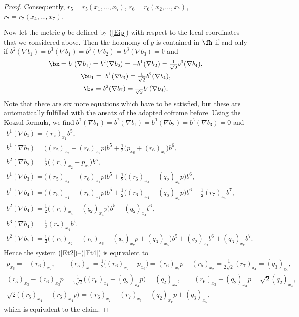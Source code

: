 \begin{proof}
Consequently, $r_5=r_5(x_1,\dots,x_7)$, $r_6=r_6(x_2,\dots,x_7)$, $r_7=r_7(x_4,\dots,x_7)$.

Now let the metric $g$ be defined by (\ref{Eip}) with respect to the local coordinates that we considered above. Then the holonomy of $g$ is contained in $\fh$ if and only if $b^2(\nabla b_{1})=b^3(\nabla b_{1})=b^3(\nabla b_{2})=b^3(\nabla b_{3})=0$ and
\begin{gather}
\bx=b^1(\nabla b_1)=b^2(\nabla b_2)=-b^1(\nabla b_2)= \tfrac1{\sqrt2} b^3(\nabla b_4), \label{Et2}\\
\bu_1=\ b^1(\nabla b_3)= \tfrac 1{\sqrt2}b^2(\nabla b_4), \\
\bv= b^2(\nabla b_7)= \tfrac 1{\sqrt2}b^1(\nabla b_4). \label{Et4}
\end{gather}
Note that there are six more equations which have to be satisfied, but these are automatically fulfilled with the ansatz of the adapted coframe before. Using the Koszul formula, we find $b^2(\nabla b_{1})=b^3(\nabla b_{1})=b^3(\nabla b_{2})=b^3(\nabla b_{3})=0$ and
\begin{gather*}
b^1(\nabla b_1) = (r_5)_{x_1} b^5, \\
b^1(\nabla b_2) = \big((r_5)_{x_2} -(r_6)_{x_2}p\big)b^5 + \tfrac12 \big(p_{x_6}+(r_6)_{x_2}\big) b^6, \\
b^{2}(\nabla b_{2})= \tfrac12\big((r_6)_{x_2}- p_{x_6}\big) b^5, \\
b^1(\nabla b_3)= \big((r_5)_{x_3} -(r_6)_{x_3}p\big)b^5 +\tfrac12\big((r_6)_{x_3}- (q_2)_{x_3}p\big) b^6 , \\
b^1(\nabla b_4) = \big( (r_5)_{x_4}-(r_6)_{x_4} p\big)b^5 +\tfrac12\big((r_6)_{x_4}-(q_2)_{x_4} p\big) b^6 +\frac12 (r_7)_{x_4}b^7 , \\
b^2(\nabla b_4) = \tfrac12\big((r_6)_{x_4}-(q_2)_{x_4}p\big) b^5 +(q_2)_{x_4}b^6 , \\
b^3(\nabla b_4) = \tfrac12 (r_7)_{x_4}b^5 , \\
b^2(\nabla b_7)= \tfrac12 \big((r_6)_{x_7}-(r_7)_{x_6} -(q_2)_{x_7} p+(q_3)_{x_5}\big)b^5 +(q_2)_{x_7}b^6+(q_3)_{x_7}b^7.
\end{gather*}
Hence the system (\ref{Et2})--(\ref{Et4}) is equivalent to
\begin{gather*}
 p_{x_6}=-(r_6)_{x_2},\qquad
(r_5)_{x_1} =\tfrac12\big((r_6)_{x_2}- p_{x_6}\big) =(r_6)_{x_2}p-(r_5)_{x_2}=\tfrac 1{2\sqrt2}(r_7)_{x_4}=(q_3)_{x_7},\\
(r_5)_{x_3} -(r_6)_{x_3}p= \tfrac1{2\sqrt 2}\big((r_6)_{x_4}-(q_2)_{x_4}p\big)=(q_2)_{x_7},\qquad
 (r_6)_{x_3}- (q_2)_{x_3}p= {\sqrt2}(q_2)_{x_4},\\
\sqrt2 \big( (r_5)_{x_4}-(r_6)_{x_4} p\big)=(r_6)_{x_7}-(r_7)_{x_6} -(q_2)_{x_7} p+(q_3)_{x_5},
\end{gather*}
which is equivalent to the claim. \end{proof}

